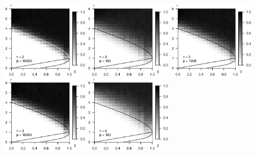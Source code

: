 \begin{figure}
      \includegraphics[width=0.32\textwidth]{./sim_strong_boundary/simulated_phase_diagram_chi-squared_nu2_p10000.eps}
      \includegraphics[width=0.32\textwidth]{./sim_strong_boundary/simulated_phase_diagram_chi-squared_nu3_p100.eps}
      \includegraphics[width=0.32\textwidth]{./sim_strong_boundary/simulated_phase_diagram_chi-squared_nu3_p1000.eps}
      \includegraphics[width=0.32\textwidth]{./sim_strong_boundary/simulated_phase_diagram_chi-squared_nu3_p10000.eps}
      \includegraphics[width=0.32\textwidth]{./sim_strong_boundary/simulated_phase_diagram_chi-squared_nu6_p100.eps}

\end{figure}
